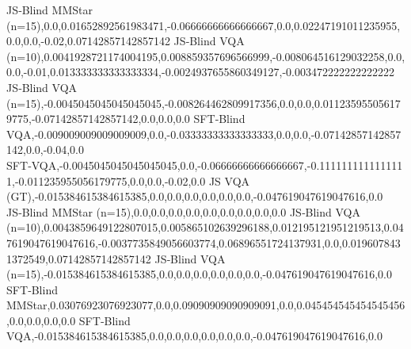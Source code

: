  JS‑Blind MMStar (n=15),0.0,0.01652892561983471,-0.06666666666666667,0.0,0.02247191011235955,0.0,0.0,-0.02,0.07142857142857142
 JS‑Blind VQA (n=10),0.0041928721174004195,0.008859357696566999,-0.008064516129032258,0.0,0.0,-0.01,0.013333333333333334,-0.0024937655860349127,-0.003472222222222222
 JS‑Blind VQA (n=15),-0.0045045045045045045,-0.008264462809917356,0.0,0.0,0.011235955056179775,-0.07142857142857142,0.0,0.0,0.0
 SFT‑Blind VQA,-0.009009009009009009,0.0,-0.03333333333333333,0.0,0.0,-0.07142857142857142,0.0,-0.04,0.0
 SFT‑VQA,-0.0045045045045045045,0.0,-0.06666666666666667,-0.1111111111111111,-0.011235955056179775,0.0,0.0,-0.02,0.0
 JS VQA (GT),-0.015384615384615385,0.0,0.0,0.0,0.0,0.0,0.0,-0.047619047619047616,0.0
 JS‑Blind MMStar (n=15),0.0,0.0,0.0,0.0,0.0,0.0,0.0,0.0,0.0
 JS‑Blind VQA (n=10),0.0043859649122807015,0.005865102639296188,0.012195121951219513,0.047619047619047616,-0.0037735849056603774,0.06896551724137931,0.0,0.0196078431372549,0.07142857142857142
 JS‑Blind VQA (n=15),-0.015384615384615385,0.0,0.0,0.0,0.0,0.0,0.0,-0.047619047619047616,0.0
 SFT‑Blind MMStar,0.03076923076923077,0.0,0.09090909090909091,0.0,0.045454545454545456,0.0,0.0,0.0,0.0
 SFT‑Blind VQA,-0.015384615384615385,0.0,0.0,0.0,0.0,0.0,0.0,-0.047619047619047616,0.0
